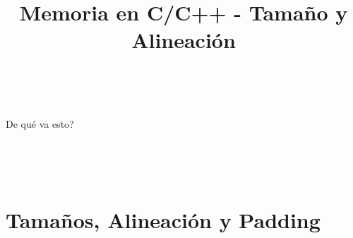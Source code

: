 

\title%
{Memoria en C/C++ - Tama\~no y Alineaci\'on}


\subject{Memoria en C/C++ - Tama\~no y Alineaci\'on}




\begin{frame}
   \titlepage
\end{frame}

~%
\begin{frame}{De qu\'e va esto?}
   \tableofcontents
\end{frame}
~%


~%
\section{Tama\~nos, Alineaci\'on y Padding}
